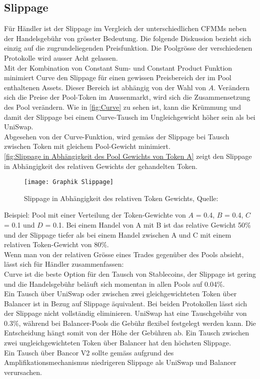 \documentclass[12pt,a4paper,titlepage,oneside,english]{article}
\begin{document}
\subsection{Slippage}
Für Händler ist der Slippage im Vergleich der unterschiedlichen CFMMs neben der Handelsgebühr von grösster Bedeutung. Die folgende Diskussion bezieht sich einzig auf die zugrundeliegenden Preisfunktion. Die Poolgrösse der verschiedenen Protokolle wird ausser Acht gelassen.\\
Mit der Kombination von Constant Sum- und Constant Product Funktion minimiert Curve den Slippage für einen gewissen Preisbereich der im Pool enthaltenen Assets. Dieser Bereich ist abhängig von der Wahl von $A$. Verändern sich die Preise der Pool-Token im Aussenmarkt, wird sich die Zusammensetzung des Pool verändern. Wie in \autoref{fig:Curve} zu sehen ist, kann die Krümmung und damit der Slippage bei einem Curve-Tausch im Ungleichgewicht höher sein als bei UniSwap.\\
Abgesehen von der Curve-Funktion, wird gemäss \cite{Martinelli8020} der Slippage bei Tausch zwischen Token mit gleichem Pool-Gewicht minimiert. \citep{Martinelli8020} \\ \autoref{fig:Slippage in Abhängigkeit des Pool Gewichts von Token A} zeigt den Slippage in Abhängigkeit des relativen Gewichts der gehandelten Token. \\
	\begin{figure}[h!]
	\begin{center}
	\texttt{[image: Graphik Slippage]}
	\caption{Slippage in Abhängigkeit des relativen Token Gewichts, Quelle: \citet{Martinelli8020} }\label{fig:Slippage in Abhängigkeit des Pool Gewichts von Token A}
	\end{center}
	\end{figure}
	
Beispiel: Pool mit einer Verteilung der Token-Gewichte von $A$ = 0.4, $B$ = 0.4, $C$ = 0.1 und $D$ = 0.1. Bei einem Handel von A mit B ist das relative Gewicht 50\% und der Slippage tiefer als bei einem Handel zwischen A und C mit einem relativen Token-Gewicht von 80\%. \citep{Martinelli8020}\\
Wenn man von der relativen Grösse eines Trades gegenüber des Pools absieht, lässt sich für Händler zusammenfassen:\\
Curve ist die beste Option für den Tausch von Stablecoins, der Slippage ist gering und die Handelsgebühr beläuft sich momentan in allen Pools auf 0.04\%. \\
Ein Tausch über UniSwap oder zwischen zwei gleichgewichteten Token über Balancer ist in Bezug auf Slippage äquivalent. Bei beiden Protokollen lässt sich der Slippage nicht vollständig eliminieren. UniSwap hat eine Tauschgebühr von 0.3\%, während bei Balancer-Pools die Gebühr flexibel festgelegt werden kann. Die Entscheidung hängt somit von der Höhe der Gebühren ab. Ein Tausch zwischen zwei ungleichgewichteten Token über Balancer hat den höchsten Slippage.\\
Ein Tausch über Bancor V2 sollte gemäss \citet{Shachav2020} aufgrund des Amplifikationsmechanismus niedrigeren Slippage als UniSwap und Balancer verursachen.
\end{document}
